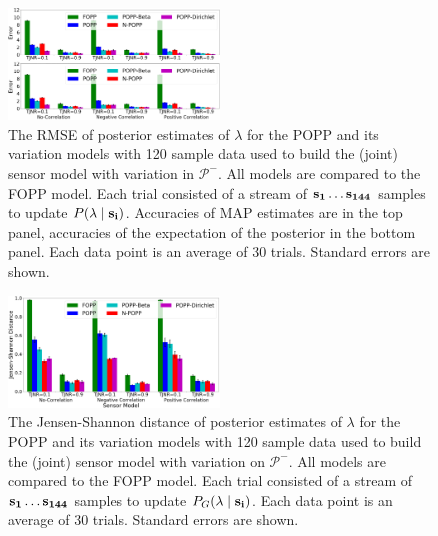 \begin{figure}[t!]
	\centering
	\includegraphics[width=0.5\textwidth]{./figures/tjnr_comparison_120.png}
    \caption{The RMSE of posterior estimates of $\lambda$ for the POPP and its variation models with 120 sample data used to build the (joint) sensor model with variation in $\mathcal{P^-}$. All models are compared to the FOPP model. Each trial consisted of a stream of $\protect\mathbf{s_1} \ldots \protect\mathbf{s_{144}}$ samples to update $P(\lambda \mid \protect\mathbf{s_i})$. Accuracies of MAP estimates are  in the top panel, accuracies of the expectation of the posterior in the bottom panel. Each data point is an average of 30 trials. Standard errors are shown.} 
	\label{fig:tjnr_comparison_120}
\end{figure}

\begin{figure}[t!]
	\centering
	\includegraphics[width=0.5\textwidth]{./figures/tjnr_comparison_120_kl.png}
	\caption{The Jensen-Shannon distance of posterior estimates of $\lambda$ for the POPP and its variation models with 120 sample data used to build the (joint) sensor model with variation on $\mathcal{P^-}$. All models are compared to the FOPP model. Each trial consisted of a stream of $\protect\mathbf{s_1} \ldots \protect\mathbf{s_{144}}$ samples to update $P_G(\lambda \mid \protect\mathbf{s_i})$. Each data point is an average of 30 trials. Standard errors are shown.} 
	\label{fig:tjnr_comparison_120_kl}
\end{figure}

